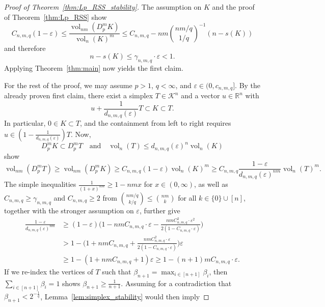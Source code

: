 \documentclass{amsart}
\newcommand\R{\mathbb{R}}
\newcommand\CK{\mathcal{K}}
\DeclareMathOperator{\vol}{vol}
\newcommand{\diff}[3]{D_{#1}^{#2} #3}
\begin{document}
\begin{proof}[Proof of Theorem~\ref{thm:Lp_RSS_stability}]
The assumption on $K$ and the proof of Theorem~\ref{thm:Lp_RSS} show
\[
    C_{n,m,q} (1-\varepsilon)
    \leq \frac{\vol_{nm}(\diff{p}{m}{K})}{\vol_n(K)^m}
    \leq C_{n,m,q} - nm \binom{nm/q}{1/q}^{-1} (n-s(K))
\]
and therefore
\[
    n - s(K)
    \leq \gamma_{n,m,q} \cdot \varepsilon
    < 1.
\]
Applying Theorem~\ref{thm:main} now yields the first claim.

For the rest of the proof, we may
assume $p > 1$, $q < \infty$, and $\varepsilon \in (0,c_{n,m,q}]$.
By the already proven first claim, there exist a simplex $T \in \CK^n$ and a vector $u \in \R^n$ with
\begin{equation}\label{eq:Lp_simplex_containments}
    u + \frac{1}{d_{n,m,q}(\varepsilon)} T
    \subset K
    \subset T.
\end{equation}
In particular, $0 \in K \subset T$,
and the containment from left to right requires $u \in (1 - \frac{1}{d_{n,m,q}(\varepsilon)}) T$.
Now,
\[
    \diff{p}{m}{K} \subset \diff{p}{m}{T}
        \quad \text{and} \quad
    \vol_n(T) \leq d_{n,m,q}(\varepsilon)^n \vol_n(K)
\]
show
\[
    \vol_{nm}(\diff{p}{m}{T})
    \geq \vol_{nm}(\diff{p}{m}{K})
    \geq C_{n,m,q} (1-\varepsilon) \vol_n(K)^m
    \geq C_{n,m,q} \frac{1-\varepsilon}{d_{n,m,q}(\varepsilon)^{nm}} \vol_n(T)^m.
\]
The simple inequalities $\frac{1}{(1+x)^{nm}} \geq 1 - nmx$ for $x \in (0,\infty)$,
as well as $C_{n,m,q} \geq \gamma_{n,m,q}$ and $C_{n,m,q} \geq 2$ from $\binom{nm/q}{k/q} \leq \binom{nm}{k}$ for all $k \in \{0\} \cup [n]$, together with the stronger assumption on $\varepsilon$,
further give
\begin{align*}
    \frac{1-\varepsilon}{d_{n,m,q}(\varepsilon)^{nm}}
    & \geq (1-\varepsilon) \bigg( 1 - nm C_{n,m,q} \cdot \varepsilon - \frac{nm C_{n,m,q}^2 \cdot \varepsilon^2}{2 (1 - C_{n,m,q} \cdot \varepsilon)} \bigg)
    \\
    & > 1 - \bigg( 1 + nm C_{n,m,q} + \frac{nm C_{n,m,q}^2 \cdot \varepsilon}{2 (1 - C_{n,m,q} \cdot \varepsilon)} \bigg) \varepsilon
    \\
    & \geq 1 - (1 + nm C_{n,m,q} + 1) \varepsilon
    \geq 1 - (n+1) m C_{n,m,q} \cdot \varepsilon.
\end{align*}
If we re-index the vertices of $T$ such that $\beta_{n+1} = \max_{i \in [n+1]} \beta_i$, then $\sum_{i \in [n+1]} \beta_i = 1$ shows $\beta_{n+1} \geq \frac{1}{n+1}$.
Assuming for a contradiction that $\beta_{n+1} < 2^{-\frac{1}{q}}$,
Lemma~\ref{lem:simplex_stability} would then imply

\end{proof}
\end{document}
